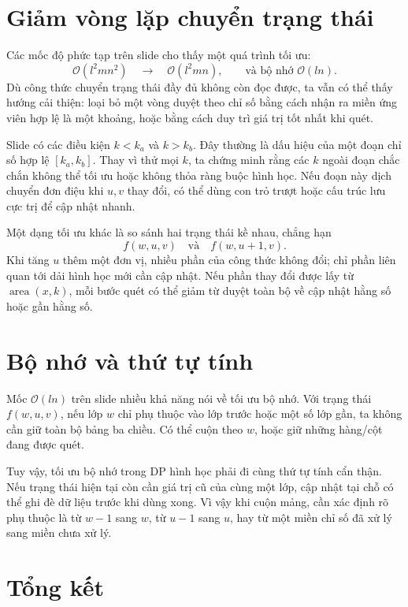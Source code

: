 \documentclass[11pt]{article}
\newcommand{\Oh}{\mathcal{O}}
\begin{document}
\section{Giảm vòng lặp chuyển trạng thái}

Các mốc độ phức tạp trên slide cho thấy một quá trình tối ưu:
\[
  \Oh(l^2mn^2)\quad\longrightarrow\quad \Oh(l^2mn),
  \qquad\text{và bộ nhớ }\Oh(ln).
\]
Dù công thức chuyển trạng thái đầy đủ không còn đọc được, ta vẫn có thể thấy
hướng cải thiện: loại bỏ một vòng duyệt theo chỉ số bằng cách nhận ra miền
ứng viên hợp lệ là một khoảng, hoặc bằng cách duy trì giá trị tốt nhất khi
quét.

Slide có các điều kiện \(k<k_a\) và \(k>k_b\). Đây thường là dấu hiệu của một
đoạn chỉ số hợp lệ \([k_a,k_b]\). Thay vì thử mọi \(k\), ta chứng minh rằng
các \(k\) ngoài đoạn chắc chắn không thể tối ưu hoặc không thỏa ràng buộc
hình học. Nếu đoạn này dịch chuyển đơn điệu khi \(u,v\) thay đổi, có thể dùng
con trỏ trượt hoặc cấu trúc lưu cực trị để cập nhật nhanh.

Một dạng tối ưu khác là so sánh hai trạng thái kề nhau, chẳng hạn
\[
  f(w,u,v)\quad\text{và}\quad f(w,u+1,v).
\]
Khi tăng \(u\) thêm một đơn vị, nhiều phần của công thức không đổi; chỉ phần
liên quan tới dải hình học mới cần cập nhật. Nếu phần thay đổi được lấy từ
\(\operatorname{area}(x,k)\), mỗi bước quét có thể giảm từ duyệt toàn bộ về
cập nhật hằng số hoặc gần hằng số.

\section{Bộ nhớ và thứ tự tính}

Mốc \(\Oh(ln)\) trên slide nhiều khả năng nói về tối ưu bộ nhớ. Với trạng
thái \(f(w,u,v)\), nếu lớp \(w\) chỉ phụ thuộc vào lớp trước hoặc một số lớp
gần, ta không cần giữ toàn bộ bảng ba chiều. Có thể cuộn theo \(w\), hoặc giữ
những hàng/cột đang được quét.

Tuy vậy, tối ưu bộ nhớ trong DP hình học phải đi cùng thứ tự tính cẩn thận.
Nếu trạng thái hiện tại còn cần giá trị cũ của cùng một lớp, cập nhật tại chỗ
có thể ghi đè dữ liệu trước khi dùng xong. Vì vậy khi cuộn mảng, cần xác định
rõ phụ thuộc là từ \(w-1\) sang \(w\), từ \(u-1\) sang \(u\), hay từ một miền
chỉ số đã xử lý sang miền chưa xử lý.

\section{Tổng kết}
\end{document}
